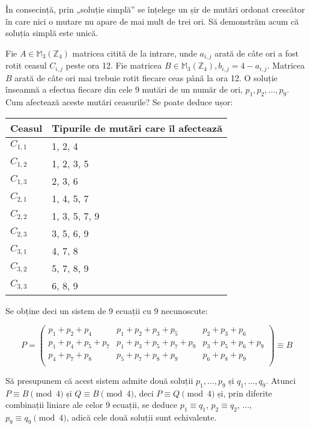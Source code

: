 În consecință, prin „soluție simplă” se înțelege un șir de mutări ordonat
crescător în care nici o mutare nu apare de mai mult de trei ori. Să
demonstrăm acum că soluția simplă este unică.

Fie $A \in \mathbb{M}_3(\mathbb{Z}_4)$ matricea citită de la intrare, unde
$a_{i,j}$ arată de câte ori a fost rotit ceasul $C_{i,j}$ peste ora 12. Fie
matricea $B \in \mathbb{M}_3(\mathbb{Z}_4), b_{i,j}=4 - a_{i,j}$. Matricea $B$
arată de câte ori mai trebuie rotit fiecare ceas până la ora 12. O soluție
înseamnă a efectua fiecare din cele 9 mutări de un număr de ori, $p_1, p_2,
\dots, p_9$. Cum afectează aceste mutări ceasurile? Se poate deduce ușor:

\begin{table}[H]
  \centering
  \begin{tabular}{| l | l |}
    \hline
    Ceasul & Tipurile de mutări care îl afectează \\ \hline
    $C_{1,1}$ & 1, 2, 4 \\
    $C_{1,2}$ & 1, 2, 3, 5 \\
    $C_{1,3}$ & 2, 3, 6 \\
    $C_{2,1}$ & 1, 4, 5, 7 \\
    $C_{2,2}$ & 1, 3, 5, 7, 9 \\
    $C_{2,3}$ & 3, 5, 6, 9 \\
    $C_{3,1}$ & 4, 7, 8 \\
    $C_{3,2}$ & 5, 7, 8, 9 \\
    $C_{3,3}$ & 6, 8, 9 \\
    \hline
  \end{tabular}
\end{table}

Se obține deci un sistem de 9 ecuații cu 9 necunoscute:

\begin{equation}
  P = 
  \begin{pmatrix}
    p_1 + p_2 + p_4 & p_1 + p_2 + p_3 + p_5 & p_2 + p_3 + p_6 \\
    p_1 + p_4 + p_5 + p_7 & p_1 + p_3 + p_5 + p_7 + p_9 & p_3 + p_5 + p_6 + p_9 \\
    p_4 + p_7 + p_8 & p_5 + p_7 + p_8 + p_9 & p_6 + p_8 + p_9 \\
  \end{pmatrix}
  \equiv B
\end{equation}

Să presupunem că acest sistem admite două soluții $p_1, \dots, p_9$ și $q_1,
\dots, q_9$. Atunci $P \equiv B \pmod{4}$ și $Q \equiv B \pmod{4}$, deci $P
\equiv Q \pmod{4}$ și, prin diferite combinații liniare ale celor 9 ecuații,
se deduce $p_1 \equiv q_1$, $p_2 \equiv q_2$, ..., $p_9 \equiv q_9 \pmod{4}$,
adică cele două soluții sunt echivalente.

